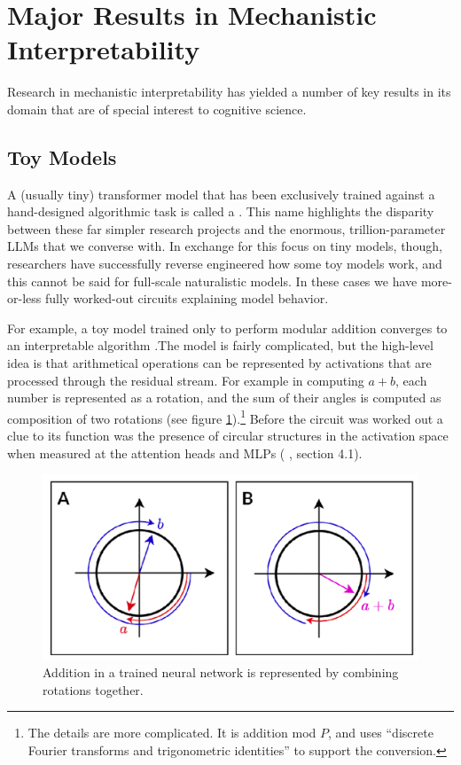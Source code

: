 \section{Major Results in Mechanistic Interpretability}

Research in mechanistic interpretability has yielded a number of key results in
its domain that are of special interest to cognitive science.

\subsection{Toy Models}

A (usually tiny) transformer model that has been exclusively trained against a
hand-designed algorithmic task is called a . This name
highlights the disparity between these far simpler research projects and the
enormous, trillion-parameter LLMs that we converse with. In exchange for this
focus on tiny models, though, researchers have successfully reverse engineered
how some toy models work, and this cannot be said for full-scale naturalistic
models. In these cases we have more-or-less fully worked-out circuits
explaining model behavior.

For example, a toy model trained only to perform modular addition converges to
an interpretable algorithm \cite{nanda2023progress}.The model is fairly
complicated, but the high-level idea is that arithmetical operations can be
represented by activations that are processed through the residual stream. For
example in computing $a + b$, each number is represented as a rotation, and the
sum of their angles is computed as composition of two rotations (see figure
\ref{toyModelAddition}).\footnote{The details are more complicated. It is
addition mod $P$, and uses ``discrete Fourier transforms and trigonometric
identities'' \cite{nanda2023progress} to support the conversion.} Before the
circuit was worked out a clue to its function was the presence of circular
structures in the activation space when measured at the attention heads and
MLPs (\cite{nanda2023progress} , section 4.1).

\begin{figure}[ht]
\centering
\includegraphics[scale=.4]{./images/toyModelAddition.png}
\caption[From \cite{nanda2023progress} .]{
      Addition in a trained neural network is represented by combining
      rotations together.
}
\label{toyModelAddition}
\end{figure}

